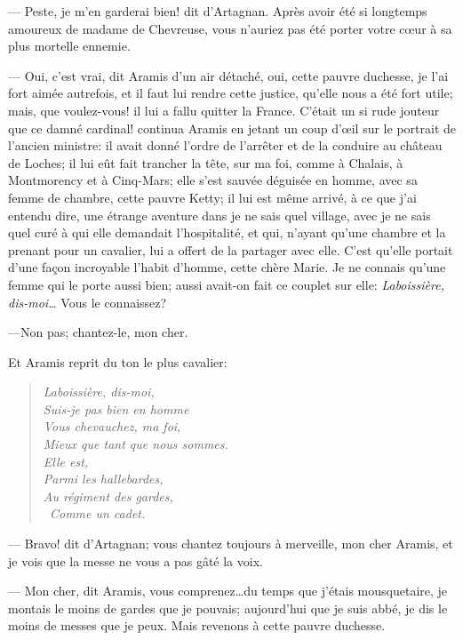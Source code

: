 — Peste, je m'en garderai bien! dit d'Artagnan. Après avoir été si longtemps amoureux de madame de Chevreuse, vous n'auriez pas été porter votre cœur à sa plus mortelle ennemie.

— Oui, c'est vrai, dit Aramis d'un air détaché, oui, cette pauvre duchesse, je l'ai fort aimée autrefois, et il faut lui rendre cette justice, qu'elle nous a été fort utile; mais, que voulez-vous! il lui a fallu quitter la France. C'était un si rude jouteur que ce damné cardinal! continua Aramis en jetant un coup d'œil sur le portrait de l'ancien ministre: il avait donné l'ordre de l'arrêter et de la conduire au château de Loches; il lui eût fait trancher la tête, sur ma foi, comme à Chalais, à Montmorency et à Cinq-Mars; elle s'est sauvée déguisée en homme, avec sa femme de chambre, cette pauvre Ketty; il lui est même arrivé, à ce que j'ai entendu dire, une étrange aventure dans je ne sais quel village, avec je ne sais quel curé à qui elle demandait l'hospitalité, et qui, n'ayant qu'une chambre et la prenant pour un cavalier, lui a offert de la partager avec elle. C'est qu'elle portait d'une façon incroyable l'habit d'homme, cette chère Marie. Je ne connais qu'une femme qui le porte aussi bien; aussi avait-on fait ce couplet sur elle: \textit{Laboissière, dis-moi\dots} Vous le connaissez?

—Non pas; chantez-le, mon cher.

Et Aramis reprit du ton le plus cavalier: 

\begin{verse}
	\begin{altverse}\itshape
	Laboissière, dis-moi,\\
	Suis-je pas bien en homme\\
Vous chevauchez, ma foi,\\
Mieux que tant que nous sommes.\\
Elle est,\\
Parmi les hallebardes,\\
Au régiment des gardes,\\\
Comme un cadet.
\end{altverse}
\end{verse}

— Bravo! dit d'Artagnan; vous chantez toujours à merveille, mon cher Aramis, et je vois que la messe ne vous a pas gâté la voix.

— Mon cher, dit Aramis, vous comprenez\dots du temps que j'étais mousquetaire, je montais le moins de gardes que je pouvais; aujourd'hui que je suis abbé, je dis le moins de messes que je peux. Mais revenons à cette pauvre duchesse.


